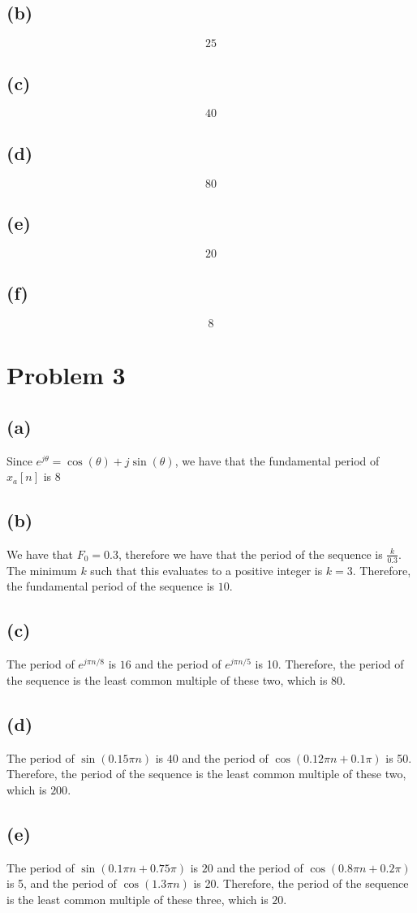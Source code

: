 \subsection*{(b)}
$$\boxed{25}$$
\subsection*{(c)}
$$\boxed{40}$$
\subsection*{(d)}
$$\boxed{80}$$
\subsection*{(e)}
$$\boxed{20}$$
\subsection*{(f)}
$$\boxed{8}$$
\section*{Problem 3}
\subsection*{(a)}
Since $e^{j\theta} = \cos(\theta) + j\sin(\theta)$, we have
that the fundamental period of $\hat{x}_a[n]$ is $\boxed{8}$
\subsection*{(b)}
We have that $F_0=0.3$, therefore we have that the period of the sequence
is $\frac{k}{0.3}$. The minimum $k$ such that this evaluates to a
positive integer is $k=3$. Therefore, the fundamental period of
the sequence is $\boxed{10}$.
\subsection*{(c)}
The period of $e^{j\pi n /8}$ is $16$ and the period of
 $e^{j\pi n /5}$ is 10. Therefore, the period of the sequence
 is the least common multiple of these two, which is $\boxed{80}$. 
\subsection*{(d)}
The period of $\sin(0.15\pi n)$ is $40$ and the period of
 $\cos(0.12\pi n+0.1\pi)$ is 50. Therefore, the period of the sequence
 is the least common multiple of these two, which is $\boxed{200}$. 
\subsection*{(e)}
The period of $\sin(0.1\pi n+0.75\pi)$ is $20$ and the period of
 $\cos(0.8\pi n+0.2\pi)$ is 5, and the period of $\cos(1.3\pi n)$ is 20. Therefore, the period of the sequence
 is the least common multiple of these three, which is $\boxed{20}$.
